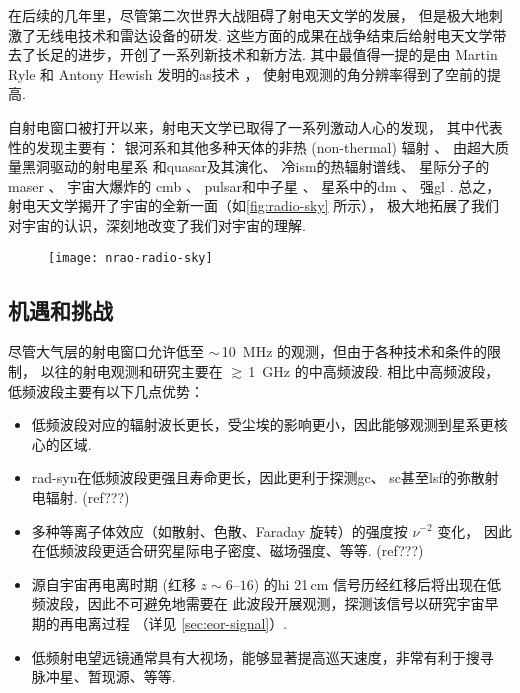 在后续的几年里，尽管第二次世界大战阻碍了射电天文学的发展，
但是极大地刺激了无线电技术和雷达设备的研发.
这些方面的成果在战争结束后给射电天文学带去了长足的进步，开创了一系列新技术和新方法.
其中最值得一提的是由 Martin Ryle 和 Antony Hewish 发明的\ac{as}技术 \cite{ryle1960}，
使射电观测的角分辨率得到了空前的提高.

自射电窗口被打开以来，射电天文学已取得了一系列激动人心的发现，
其中代表性的发现主要有：
银河系和其他多种天体的非热 (non-thermal) 辐射 \cite{reber1940}、
由超大质量黑洞驱动的射电星系\cite{baade1954}
和\ac{quasar}\cite{hazard1963,schmidt1963}及其演化、
冷\ac{ism}的热辐射谱线、
星际分子的\ac{maser} \cite{weaver1965}、
宇宙大爆炸的 \ac{cmb} \cite{penzias1965}、
\ac{pulsar}和中子星 \cite{hewish1968}、
星系中的\ac{dm} \cite{roberts1975}、
强\ac{gl} \cite{walsh1979}.
总之，射电天文学揭开了宇宙的全新一面（如\autoref{fig:radio-sky} 所示），
极大地拓展了我们对宇宙的认识，深刻地改变了我们对宇宙的理解.

\begin{figure}[htp]
  \centering
  \texttt{[image: nrao-radio-sky]}
  \label{fig:radio-sky}
\end{figure}

\subsection{机遇和挑战}

尽管大气层的射电窗口允许低至 $\sim$\,\SI{10}{\MHz} 的观测，但由于各种技术和条件的限制，
以往的射电观测和研究主要在 $\gtrsim$\,\SI{1}{\GHz} 的中高频波段.
相比中高频波段，低频波段主要有以下几点优势：
\begin{itemize}
  \item 低频波段对应的辐射波长更长，受尘埃的影响更小，因此能够观测到星系更核心的区域.
  \item \ac{rad-syn}在低频波段更强且寿命更长，因此更利于探测\ac{gc}、
    \ac{sc}甚至\ac{lsf}的弥散射电辐射. (ref???)
  \item 多种等离子体效应（如散射、色散、Faraday 旋转）的强度按 $\nu^{-2}$ 变化，
    因此在低频波段更适合研究星际电子密度、磁场强度、等等. (ref???)
  \item 源自宇宙再电离时期 (红移 $z \sim \numrange{6}{16}$)
    的\ac{hi} 21\,cm 信号历经红移后将出现在低频波段，因此不可避免地需要在
    此波段开展观测，探测该信号以研究宇宙早期的再电离过程
    （详见 \autoref{sec:eor-signal}）.
  \item 低频射电望远镜通常具有大视场，能够显著提高巡天速度，非常有利于搜寻
    脉冲星、暂现源、等等.
\end{itemize}

